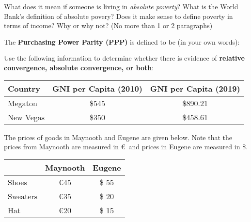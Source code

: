 \documentclass[12pt]{exam}
\begin{document}
\begin{questions}
    
\question[7] 
What does it mean if someone is living in \emph{absolute poverty}? 
What is the World Bank's definition of absolute povery?
Does it make sense to define poverty in terms of income? 
Why or why not? 
(No more than 1 or 2 paragraphs)

\begin{solution}
    \vspace*{2in}
\end{solution}


\question[3] 
The \textbf{Purchasing Power Parity (PPP)} is defined to be (in your own words): 


\question[10]
Use the following information to determine whether there is evidence of \textbf{relative convergence, absolute convergence, or both}:

\begin{table}[ht]
  \centering
  \label{tab:convergence}
  \begin{tabular}{lcc}
    \toprule
    Country & GNI per Capita (2010) & GNI per Capita (2019) \\
    \midrule
    Megaton & \$545 & \$890.21 \\
    New Vegas & \$350 & \$458.61 \\
    \bottomrule
  \end{tabular}
\end{table}

\newpage

\question
The prices of goods in Maynooth and Eugene are given below. 
Note that the prices from Maynooth are measured in \euro $\,$ and prices in Eugene are measured in \$.

\begin{table}[ht]
  \centering
  \label{tab:prices}
  \begin{tabular}{lcc}
    \toprule
     & Maynooth & Eugene \\
    \midrule
    Shoes & \euro 45 & \$ 55 \\
    Sweaters & \euro 35 & \$ 20 \\
    Hat & \euro 20 & \$ 15 \\
    \bottomrule
  \end{tabular}
\end{table}


\end{questions}
\end{document}

